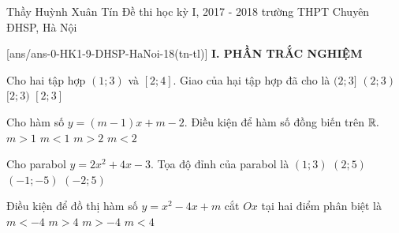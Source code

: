 	\begin{name}
		{Thầy Huỳnh Xuân Tín}
		{Đề thi học kỳ I, 2017 - 2018 trường THPT Chuyên ĐHSP, Hà Nội}
	\end{name}
	\setcounter{ex}{0}\setcounter{bt}{0}
	[ans/ans-0-HK1-9-DHSP-HaNoi-18(tn-tl)]
\noindent\textbf{I. PHẦN TRẮC NGHIỆM}



\begin{ex}%
	Cho hai tập hợp $(1;3)$ và $[2;4]$. Giao của hại tập hợp đã cho là
	\choice
	{$(2;3]$}
	{$(2;3)$}
	{\True$[2;3)$}
	{$[2;3]$}
	\loigiai{ 	\immini{Ta chọn miền không gạch bỏ trong hình vẽ sau}
	{\begin{tikzpicture}
	\draw[->](-1,0)->(5,0);
	\IntervalLR{-1}{1}
	\def\skipInterval{0.5cm}%
	\IntervalGRF{}{}{\big(}{1}%
	\IntervalLR{3}{4.8}
	\def\skipInterval{0.5cm}%
	\IntervalGRF{\big)}{3}{}{}%
	
	\IntervalLR{-1}{2}
	\def\skipInterval{0.5cm}%
	\IntervalGRF{}{}{\big[}{2}%
	\IntervalLR{4}{4.8}
	\def\skipInterval{0.5cm}%
	\IntervalGRF{\big]}{4}{}{}%
	\end{tikzpicture}}

	}
\end{ex}

\begin{ex}%
	Cho hàm số $y=(m-1)x+m-2$. Điều kiện để hàm số đồng biến trên $\Bbb{R}.$
	\choice
	{\True $m>1$}
	{$m<1$}
	{$m>2$}
	{$m<2$}
\end{ex}


\begin{ex}%
	Cho parabol $y=2x^2+4x-3$. Tọa độ đỉnh của parabol là
	\choice
	{$(1;3)$}
	{$(2;5)$}
	{\True $(-1;-5)$}
	{$(-2;5)$}
\end{ex}

\begin{ex}%
	Điều kiện để đồ thị hàm số $y=x^2-4x+m$ cắt $Ox$ tại hai điểm phân biệt là
	\choice
	{$m<-4$}
	{$m>4$} 
	{$m>-4$}
	{\True $m<4$}
\end{ex}


